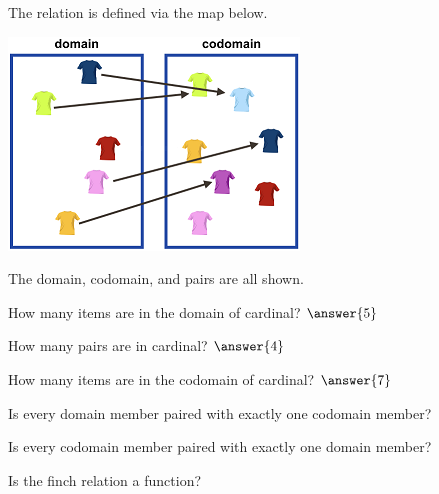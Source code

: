 \documentclass{ximera}
\begin{document}
  
  \begin{definition}
The relation  is defined via the map below.

  \includegraphics[width=292px,height=214px]{pics/r32.png}
  
  The domain, codomain, and pairs are all shown.


  
  \end{definition}
  


\begin{exercise}
How many items are in the domain of cardinal? $\answer{5}$
\end{exercise}


\begin{exercise}
How many pairs are in cardinal? $\answer{4}$
\end{exercise}

\begin{exercise}
How many items are in the codomain of cardinal? $\answer{7}$
\end{exercise}




\begin{exercise}
Is every domain member paired with exactly one codomain member?

  \begin{multipleChoice}
  \end{multipleChoice}
\end{exercise}


\begin{exercise}
Is every codomain member paired with exactly one domain member?

  \begin{multipleChoice}
  \end{multipleChoice}
\end{exercise}



\begin{exercise}
Is the finch relation a function?

  \begin{multipleChoice}
  \end{multipleChoice}
\end{exercise}
\end{document}
